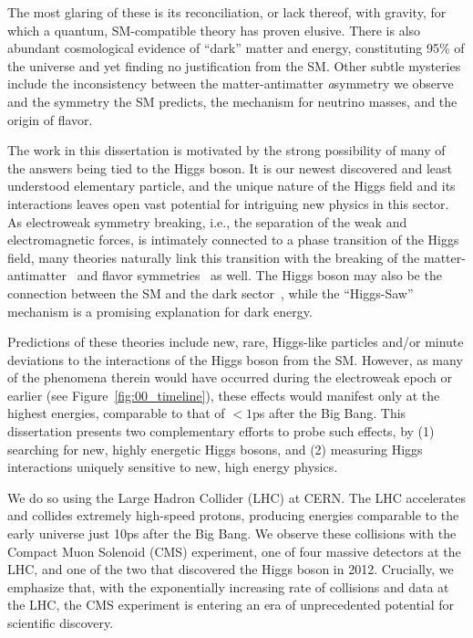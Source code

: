 The most glaring of these is its reconciliation, or lack thereof, with gravity, for which a quantum, SM-compatible theory has proven elusive.
There is also abundant cosmological evidence of ``dark'' matter and energy, constituting 95\% of the universe and yet finding no justification from the SM.
Other subtle mysteries include the inconsistency between the matter-antimatter \textit{a}symmetry  we observe and the symmetry the SM predicts, the mechanism for neutrino masses, and the origin of flavor.

The work in this dissertation is motivated by the strong possibility of many of the answers being tied to the Higgs boson.
It is our newest discovered and least understood elementary particle, and the unique nature of the Higgs field and its interactions leaves open vast potential for intriguing new physics in this sector.
As electroweak symmetry breaking, i.e., the separation of the weak and electromagnetic forces, is intimately connected to a phase transition of the Higgs field, many theories naturally link this transition with the breaking of the matter-antimatter~\cite{Morrissey_2012} and flavor symmetries~\cite{BAZZOCCHI2005372} as well.
The Higgs boson may also be the connection between the SM and the dark sector~\cite{sym13122406}, while the ``Higgs-Saw''~\cite{Krauss:2013oea} mechanism is a promising explanation for dark energy.

Predictions of these theories include new, rare, Higgs-like particles and/or minute deviations to the interactions of the Higgs boson from the SM.
However, as many of the phenomena therein would have occurred during the electroweak epoch or earlier (see Figure~\ref{fig:00_timeline}), these effects would manifest only at the highest energies, comparable to that of $<1$ps after the Big Bang.
This dissertation presents two complementary efforts to probe such effects, by (1) searching for new, highly energetic Higgs bosons, and (2) measuring Higgs interactions uniquely sensitive to new, high energy physics.

We do so using the Large Hadron Collider (LHC) at CERN. 
The LHC accelerates and collides extremely high-speed protons, producing energies comparable to the early universe just 10ps after the Big Bang.
We observe these collisions with the Compact Muon Solenoid (CMS) experiment, one of four massive detectors at the LHC, and one of the two that discovered the Higgs boson in 2012.
Crucially, we emphasize that, with the exponentially increasing rate of collisions and data at the LHC, the CMS experiment is entering an era of unprecedented potential for scientific discovery. 

